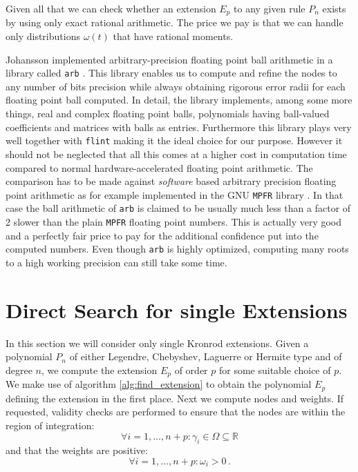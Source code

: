\documentclass[a4paper,10pt]{article}
\begin{document}
Given all that we can check whether an extension $E_p$ to any given rule $P_n$
exists by using only exact rational arithmetic. The price we pay is that we can
handle only distributions $\omega(t)$ that have rational moments.

Johansson implemented arbitrary-precision floating point ball arithmetic in a
library called \texttt{arb} \cite{arb}. This library enables us to compute and
refine the nodes to any number of bits precision while always obtaining rigorous
error radii for each floating point ball computed. In detail, the library implements,
among some more things, real and complex floating point balls, polynomials having
ball-valued coefficients and matrices with balls as entries. Furthermore this library plays
very well together with \texttt{flint} making it the ideal choice for our purpose.
However it should not be neglected that all this comes at a higher cost
in computation time compared to normal hardware-accelerated floating point arithmetic.
The comparison has to be made against \emph{software} based arbitrary precision floating
point arithmetic as for example implemented in the GNU \texttt{MPFR} library \cite{mpfr}.
In that case the ball arithmetic of \texttt{arb} is claimed to be usually much less than
a factor of 2 slower than the plain \texttt{MPFR} floating point numbers. This is
actually very good and a perfectly fair price to pay for the additional confidence put
into the computed numbers. Even though \texttt{arb} is highly optimized, computing many
roots to a high working precision can still take some time.


\FloatBarrier
\section{Direct Search for single Extensions}

In this section we will consider only single Kronrod extensions. Given a polynomial
$P_n$ of either Legendre, Chebyshev, Laguerre or Hermite type and of degree $n$, we compute
the extension $E_p$ of order $p$ for some suitable choice of $p$. We make use of algorithm
\ref{alg:find_extension} to obtain the polynomial $E_p$ defining the extension in
the first place. Next we compute nodes and weights. If requested, validity checks
are performed to ensure that the nodes are within the region of integration:
\begin{equation}
  \forall i = 1, \ldots, n+p: \gamma_i \in \Omega \subseteq \mathbb{R}
\end{equation}
and that the weights are positive:
\begin{equation}
  \forall i = 1, \ldots, n+p: \omega_i > 0 \,.
\end{equation}
\end{document}
